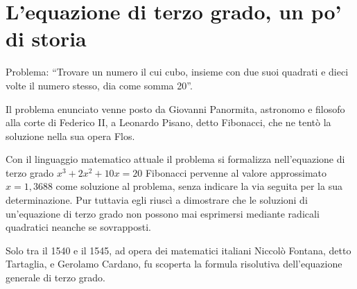 % 
% 
% 
% 
% 


\section{L'equazione di terzo grado, un po' di storia}
\label{sec:eq2gr_gradosup}

Problema: ``Trovare un numero il cui cubo, insieme con due suoi quadrati e 
dieci 
volte il numero stesso, dia come somma 20''.

Il problema enunciato venne posto da Giovanni Panormita, astronomo e filosofo 
alla corte di Federico II, a Leonardo Pisano, detto Fibonacci, che ne tentò la 
soluzione nella sua opera Flos.

Con il linguaggio matematico attuale il problema si formalizza nell'equazione 
di 
terzo grado \(x^3+2x^2+10x=20\) Fibonacci pervenne al valore approssimato 
\(x=1,3688\) come soluzione al problema, senza indicare la via seguita per la 
sua 
determinazione. Pur tuttavia egli riuscì a dimostrare che le soluzioni di 
un'equazione di terzo grado non possono mai esprimersi mediante radicali 
quadratici neanche se sovrapposti.

Solo tra il 1540 e il 1545, ad opera dei matematici italiani Niccolò Fontana, 
detto Tartaglia, e Gerolamo Cardano, fu scoperta la formula risolutiva 
dell'equazione generale di terzo grado.

